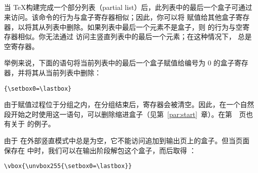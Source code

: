 \documentclass{book}
\begin{document}
\subsection{}
\label{lastbox}

当 \TeX 构建完成一个部分列表（partial list）后，此列表中的最后一个盒子可通过  来访问。该命令的行为与盒子寄存器相似；因此，你可以将  赋值给其他盒子寄存器，以将其从列表中删除。如果列表中最后一个元素不是盒子，则  的行为与空寄存器相似。你无法通过  访问主竖直列表中的最后一个元素；在这种情况下， 总是空寄存器。

举例来说，下面的语句将当前列表中的最后一个盒子赋值给编号为 0 的盒子寄存器，并将其从当前列表中删除：
\begin{verbatim}
{\setbox0=\lastbox}
\end{verbatim}
由于赋值过程位于分组之内，在分组结束后，寄存器会被清空。因此，在一个自然段开始之时使用这一语句，可以删除缩进盒子（见第~\ref{par:start}~章）。在第~\pageref{varioset}~页也有关于  的例子。

由于  在外部竖直模式中总是为空，它不能访问追加到输出页上的盒子。但当页面保存在  中时，我们可以在输出阶段解包这个盒子，而后取得 ：
\begin{verbatim}
\vbox{\unvbox255{\setbox0=\lastbox}}
\end{verbatim}
\end{document}
